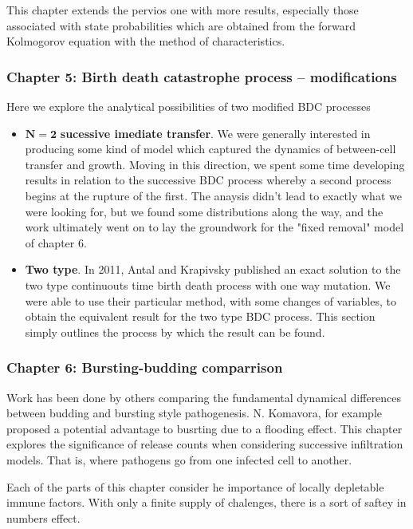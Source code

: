 This chapter extends the pervios one with more results,  especially those associated with state probabilities which are obtained from the forward Kolmogorov equation with the method of characteristics. 




\subsubsection{Chapter 5: Birth death catastrophe process -- modifications}

Here we explore the analytical possibilities of two modified BDC processes
\begin{itemize}
\item $\mathbf{N = 2}$ \textbf{sucessive imediate transfer}. We were generally interested in producing some kind of model which captured the dynamics of between-cell transfer and growth.  Moving in this direction,  we spent some time developing results in relation to the successive BDC process whereby a second process begins at the rupture of the first.  The anaysis didn't lead to exactly what we were looking for, but we found some distributions along the way,  and the work ultimately went on to lay the groundwork for the "fixed removal" model of chapter 6.   


\item \textbf{Two type}.  In 2011,  Antal and Krapivsky \cite{antal2011exact} published an exact solution to the two type continuouts time birth death process with one way mutation.  We were able to use their particular method, with some changes of variables,  to obtain the equivalent result for the two type BDC process.  This section simply outlines the process by which the result can be found. 


\end{itemize}


\subsubsection{Chapter 6: Bursting-budding comparrison}



Work has been done by others \cite{komarova2007viral} \cite{yuan2011stochastic} \cite{pearson2011stochastic} \cite{capistran2018extracellular} comparing the fundamental dynamical differences between budding and bursting style pathogenesis.  N. Komavora, for example proposed a potential advantage to busrting due to a flooding effect.  This chapter explores the significance of release counts when considering successive infiltration models.  That is, where pathogens go from one infected cell to another. \par
Each of the parts of this chapter consider he importance of locally depletable immune factors.  With only a finite supply of chalenges,  there is a sort of saftey in numbers effect.


